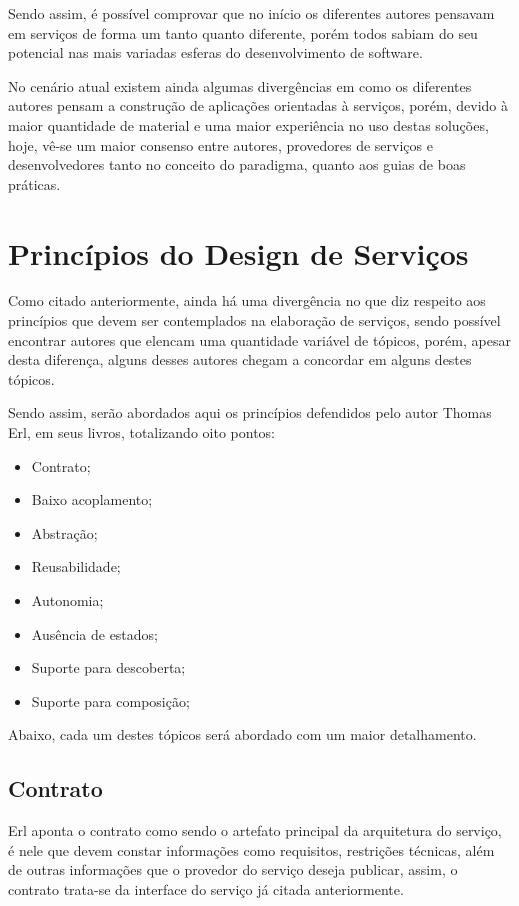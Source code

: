 \documentclass[12pt]{article}
\begin{document}
Sendo assim, é possível comprovar que no início os diferentes autores pensavam em serviços de forma um tanto quanto diferente, porém todos sabiam do seu potencial nas mais variadas esferas do desenvolvimento de software.

No cenário atual existem ainda algumas divergências em como os diferentes autores pensam a construção de aplicações orientadas à serviços, porém, devido à maior quantidade de material e uma maior experiência no uso destas soluções, hoje, vê-se um maior consenso entre autores, provedores de serviços e desenvolvedores tanto no conceito do paradigma, quanto aos guias de boas práticas.

\section{Princípios do Design de Serviços}

Como citado anteriormente, ainda há uma divergência no que diz respeito aos princípios que devem ser contemplados na elaboração de serviços, sendo possível encontrar autores que elencam uma quantidade variável de tópicos, porém, apesar desta diferença, alguns desses autores chegam a concordar em alguns destes tópicos.

Sendo assim, serão abordados aqui os princípios defendidos pelo autor Thomas Erl, em seus livros, totalizando oito pontos:

\begin{itemize}
	\item Contrato;
	\item Baixo acoplamento;
	\item Abstração;
	\item Reusabilidade;
	\item Autonomia;
	\item Ausência de estados;
	\item Suporte para descoberta;
	\item Suporte para composição;
\end{itemize}

Abaixo, cada um destes tópicos será abordado com um maior detalhamento.

\subsection{Contrato}

Erl aponta o contrato como sendo o artefato principal da arquitetura do serviço, é nele que devem constar informações como requisitos, restrições técnicas, além de outras informações que o provedor do serviço deseja publicar, assim, o contrato trata-se da interface do serviço já citada anteriormente.
\end{document}
